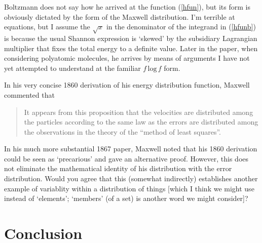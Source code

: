\documentclass{article}
\begin{document}
Boltzmann does not say how he arrived at the function (\ref{hfun}), but its form is obviously dictated by the form of the Maxwell distribution. I'm terrible at equations, but I assume the $\sqrt x$ in the denominator of the integrand in (\ref{hfunb}) is because the usual Shannon expression is `skewed' by the subsidiary Lagrangian multiplier that fixes the total energy to a definite value. Later in the paper, when considering polyatomic molecules, he arrives by means of arguments I have not yet attempted to understand at the familiar $f\, \textrm{log}\,f$ form.

In his very concise 1860 derivation of his energy distribution function, Maxwell commented that

\begin{quote}\small

It appears from this proposition that the velocities are distributed among the particles according  to the same law as the errors are distributed among the observations in the theory of the ``method of least squares''.

\end{quote}\normalsize

In his much more substantial 1867 paper, Maxwell noted that his 1860 derivation could be seen as `precarious' and gave an alternative proof. However, this does not eliminate the mathematical identity of his distribution with the error distribution. Would you agree that this (somewhat indirectly) establishes another example of variablity within a distribution of things [which I think we might use instead of `elements'; `members' (of a set) is another word we might consider]?


\section{Conclusion}

  

\end{document}
